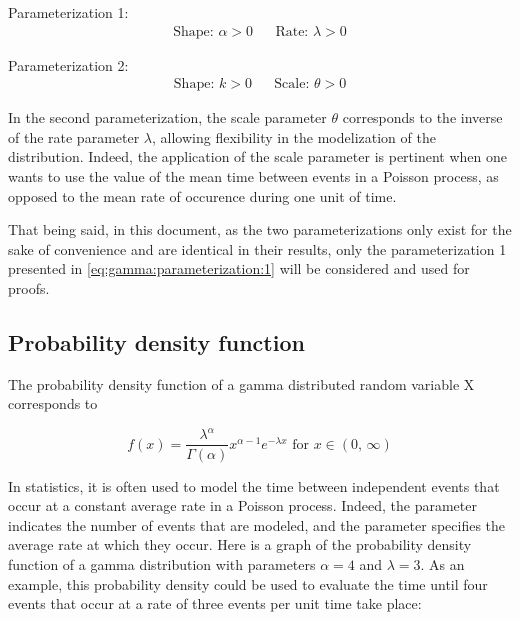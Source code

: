 \documentclass[12pt]{article}
\begin{document}
\noindent Parameterization 1:
\vspace*{-24pt}
\begin{align}\label{eq:gamma:parameterization:1}
	\text{Shape: } \alpha>0		&&	\text{Rate: }\lambda>0
\end{align}

\noindent Parameterization 2:
\vspace*{-24pt}
\begin{align}\label{eq:gamma:parameterization:2}
	\text{Shape: } k>0			&&	\text{Scale: }\theta>0
\end{align}

In the second parameterization, the scale parameter $\theta$ corresponds to the inverse of the rate parameter $\lambda$,
allowing flexibility in the modelization of the distribution. Indeed, the application of the scale parameter is
pertinent when one wants to use the value of the mean time between events in a Poisson process, as
opposed to the mean rate of occurence during one unit of time.

That being said, in this document, as the two parameterizations only exist for the sake of convenience and are identical
in their results, only the parameterization 1 presented in \autoref{eq:gamma:parameterization:1} will be considered and
used for proofs.


\pagebreak
\subsection{Probability density function }\label{subsec:gamma:pdf}

The probability density function of a gamma distributed random variable X corresponds to 

\begin{equation}\label{eq:gamma:pdf}
	f(x) = \frac{\lambda^\alpha}{\Gamma(\alpha)}x^{\alpha-1}e^{-\lambda x}\text{ for }x\in (0,\,\infty)
\end{equation}

In statistics, it is often used to model the time between independent events that occur at a constant average rate in a Poisson process. Indeed, the parameter \alpha indicates the number of events that are modeled, and the parameter \lambda specifies the average rate at which they occur. 
Here is a graph of the probability density function of a gamma distribution with parameters $\alpha=4$ and $\lambda=3$. As an example, this probability density could be used to evaluate the time until four events that occur at a rate of three events per unit time take place:
\end{document}
